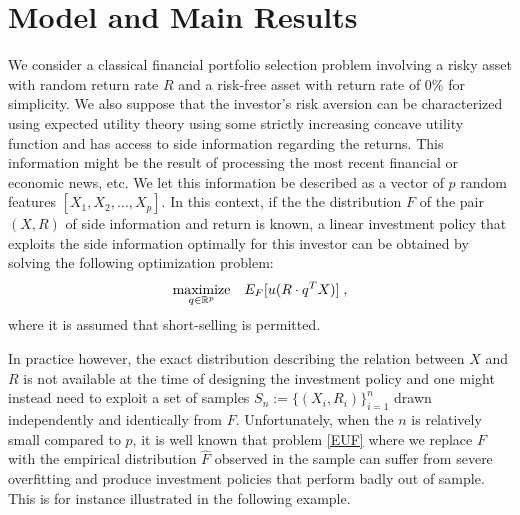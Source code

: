 \section{Model and Main Results}
\newcommand{\Expect}{E}
\newcommand{\Prob}{P}
\newcommand{\F}{F}
\newcommand{\Fhat}{{\hat{\F}}}
\newcommand{\qhat}{{\hat{q}}}
\newcommand{\Sx}{{\mathcal{S}_X}}
\newcommand{\Sr}{{\mathcal{S}_R}}
\newcommand{\Sn}{S_n}
\newcommand{\urange}{u_{\mbox{\footnotesize range}}}
\newcommand{\qhatOp}{{\bold{\qhat}}}







We consider a classical financial portfolio selection problem involving a risky asset with
random return rate $R$ and a risk-free asset with return rate of $0\%$ for simplicity. We
also suppose that the investor's risk aversion can be characterized using expected utility
theory using some strictly increasing concave utility function and has access to side
information regarding the returns. This information might be the result of processing the
most recent financial or economic news, etc. We let this information be described as a
vector of $p$ random features $[X_1,X_2,\dots,X_p]$. In this context, if the the
distribution $\F$ of the pair $(X,R)$ of side information and return is known, a linear
investment policy that exploits the side information optimally for this investor can be
obtained by solving the following optimization problem:
\begin{equation}
\maximize_{q\in\Re^p}\;\;\;\Expect_\F[u(R\cdot q^TX)]\;,\label{EUF}
\end{equation}
where it is assumed that short-selling is permitted. 

In practice however, the exact distribution describing the relation between $X$ and $R$ is
not available at the time of designing the investment policy and one might instead need to
exploit a set of samples $\Sn:=\{(X_i,R_i)\}_{i=1}^n$ drawn independently and identically
from $\F$. Unfortunately, when the $n$ is relatively small compared to $p$, it is well
known that problem \eqref{EUF} where we replace $\F$ with the empirical distribution
$\Fhat$ observed in the sample can suffer from severe overfitting and produce investment
policies that perform badly out of sample. This is for instance illustrated in the
following example.

